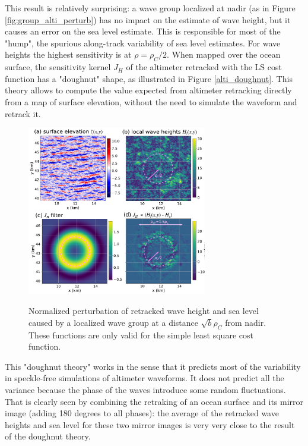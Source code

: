 This result is relatively surprising: a wave group localized at nadir (as in Figure \ref{fig:group_alti_perturb}) has no impact on the estimate of wave height, but it causes an error on the sea level estimate. This is responsible for most of the "hump", the spurious  along-track variability of sea level estimates. For wave heights the highest sensitivity is at $\rho=\rho_C/2$. When mapped over the ocean surface, the sensitivity kernel $J_H$ of the altimeter retracked with the LS cost function has a "doughnut" shape, as illustrated in Figure \ref{alti_doughnut}. This theory allows to compute the value expected from altimeter retracking directly from a map of surface elevation, without the need to simulate the waveform and retrack it. 
\begin{figure}[h!]
\centerline{\includegraphics[width=0.7\textwidth]{FIGS_CH_SAT/doughnut-footprint-for-altimeters.png}}
  \caption{Normalized perturbation of retracked wave height and sea level caused by a localized wave group at a distance $\sqrt{b} \rho_C$ from nadir. These functions are only valid for the simple least square cost function.}{} \label{fig:alti_doughnut}
\end{figure}
This "doughnut theory" works in the sense that it predicts most of the variability in speckle-free simulations of altimeter waveforms. It does not predict all the variance because the phase of the waves introduce some random fluctuations. That is clearly seen by combining the retraking of an ocean surface and its mirror image (adding 180 degrees to all phases): the average of the retracked wave heights and sea level for these two mirror images is very very close to the result of the doughnut theory. 
